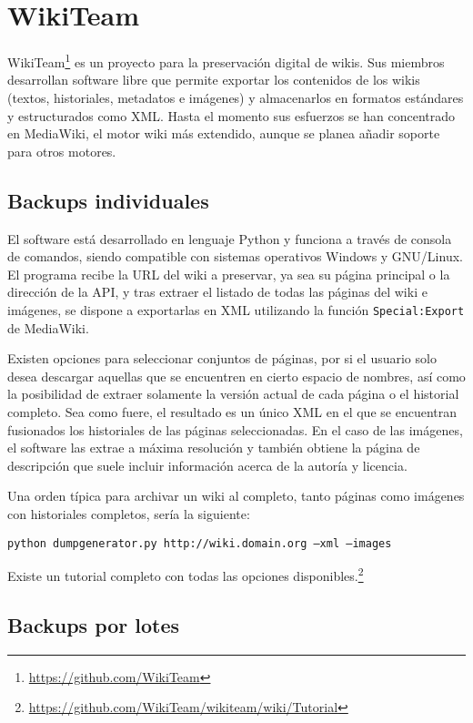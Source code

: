 \documentclass[14pt,twocolumn]{article}
\begin{document}
\section{WikiTeam}

WikiTeam\footnote{\href{https://github.com/WikiTeam}{https://github.com/WikiTeam}} es un proyecto para la preservación digital de wikis. Sus miembros desarrollan software libre que permite exportar los contenidos de los wikis (textos, historiales, metadatos e imágenes) y almacenarlos en formatos estándares y estructurados como XML. Hasta el momento sus esfuerzos se han concentrado en MediaWiki, el motor wiki más extendido, aunque se planea añadir soporte para otros motores.

\subsection{Backups individuales}

El software está desarrollado en lenguaje Python y funciona a través de consola de comandos, siendo compatible con sistemas operativos Windows y GNU/Linux. El programa recibe la URL del wiki a preservar, ya sea su página principal o la dirección de la API, y tras extraer el listado de todas las páginas del wiki e imágenes, se dispone a exportarlas en XML  utilizando la función {\tt Special:Export} de MediaWiki.

Existen opciones para seleccionar conjuntos de páginas, por si el usuario solo desea descargar aquellas que se encuentren en cierto espacio de nombres, así como la posibilidad de extraer solamente la versión actual de cada página o el historial completo. Sea como fuere, el resultado es un único XML en el que se encuentran fusionados los historiales de las páginas seleccionadas. En el caso de las imágenes, el software las extrae a máxima resolución y también obtiene la página de descripción que suele incluir información acerca de la autoría y licencia.

Una orden típica para archivar un wiki al completo, tanto páginas como imágenes con historiales completos, sería la siguiente:

{\tt python dumpgenerator.py http://wiki.domain.org --xml --images}

Existe un tutorial completo con todas las opciones disponibles.\footnote{\href{https://github.com/WikiTeam/wikiteam/wiki/Tutorial}{https://github.com/WikiTeam/wikiteam/wiki/Tutorial}}

\subsection{Backups por lotes}
\end{document}
